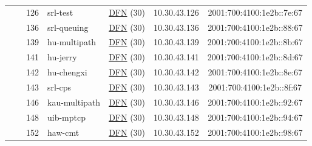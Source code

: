 \begin{small}
\begin{center}
\begin{longtable}{|c|c|c|c|c|c|c|c|}
  &  & \tiny{126} & \multicolumn{1}{|l|}{\tiny{srl-test}} & \multicolumn{2}{|c|}{\tiny{\href{https://www.dfn.de}{DFN} (30)}} & \tiny{10.30.43.126} & \tiny{2001:700:4100:1e2b::7e:67} \\* \cline{3-3}\cline{4-4}\cline{5-5}\cline{6-6}\cline{7-7}\cline{8-8}
  &  & \tiny{136} & \multicolumn{1}{|l|}{\tiny{srl-queuing}} & \multicolumn{2}{|c|}{\tiny{\href{https://www.dfn.de}{DFN} (30)}} & \tiny{10.30.43.136} & \tiny{2001:700:4100:1e2b::88:67} \\* \cline{3-3}\cline{4-4}\cline{5-5}\cline{6-6}\cline{7-7}\cline{8-8}
  &  & \tiny{139} & \multicolumn{1}{|l|}{\tiny{hu-multipath}} & \multicolumn{2}{|c|}{\tiny{\href{https://www.dfn.de}{DFN} (30)}} & \tiny{10.30.43.139} & \tiny{2001:700:4100:1e2b::8b:67} \\* \cline{3-3}\cline{4-4}\cline{5-5}\cline{6-6}\cline{7-7}\cline{8-8}
  &  & \tiny{141} & \multicolumn{1}{|l|}{\tiny{hu-jerry}} & \multicolumn{2}{|c|}{\tiny{\href{https://www.dfn.de}{DFN} (30)}} & \tiny{10.30.43.141} & \tiny{2001:700:4100:1e2b::8d:67} \\* \cline{3-3}\cline{4-4}\cline{5-5}\cline{6-6}\cline{7-7}\cline{8-8}
  &  & \tiny{142} & \multicolumn{1}{|l|}{\tiny{hu-chengxi}} & \multicolumn{2}{|c|}{\tiny{\href{https://www.dfn.de}{DFN} (30)}} & \tiny{10.30.43.142} & \tiny{2001:700:4100:1e2b::8e:67} \\* \cline{3-3}\cline{4-4}\cline{5-5}\cline{6-6}\cline{7-7}\cline{8-8}
  &  & \tiny{143} & \multicolumn{1}{|l|}{\tiny{srl-cps}} & \multicolumn{2}{|c|}{\tiny{\href{https://www.dfn.de}{DFN} (30)}} & \tiny{10.30.43.143} & \tiny{2001:700:4100:1e2b::8f:67} \\* \cline{3-3}\cline{4-4}\cline{5-5}\cline{6-6}\cline{7-7}\cline{8-8}
  &  & \tiny{146} & \multicolumn{1}{|l|}{\tiny{kau-multipath}} & \multicolumn{2}{|c|}{\tiny{\href{https://www.dfn.de}{DFN} (30)}} & \tiny{10.30.43.146} & \tiny{2001:700:4100:1e2b::92:67} \\* \cline{3-3}\cline{4-4}\cline{5-5}\cline{6-6}\cline{7-7}\cline{8-8}
  &  & \tiny{148} & \multicolumn{1}{|l|}{\tiny{uib-mptcp}} & \multicolumn{2}{|c|}{\tiny{\href{https://www.dfn.de}{DFN} (30)}} & \tiny{10.30.43.148} & \tiny{2001:700:4100:1e2b::94:67} \\* \cline{3-3}\cline{4-4}\cline{5-5}\cline{6-6}\cline{7-7}\cline{8-8}
  &  & \tiny{152} & \multicolumn{1}{|l|}{\tiny{haw-cmt}} & \multicolumn{2}{|c|}{\tiny{\href{https://www.dfn.de}{DFN} (30)}} & \tiny{10.30.43.152} & \tiny{2001:700:4100:1e2b::98:67} \\* \cline{3-3}\cline{4-4}\cline{5-5}\cline{6-6}\cline{7-7}\cline{8-8}

\end{longtable}
\end{center}
\end{small}
